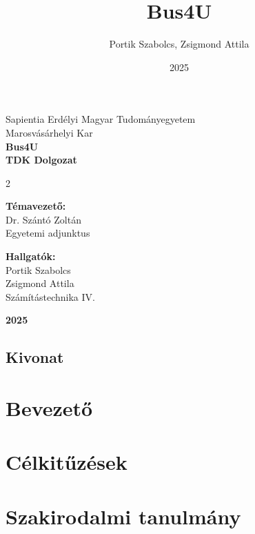 \documentclass[12pt, twoside]{report}
\title{Bus4U}
\author{Portik Szabolcs, Zsigmond Attila}
\date{2025}
\begin{document}
\begin{titlepage}
  \center
  \Large
  Sapientia Erdélyi Magyar Tudományegyetem \\
  Marosvásárhelyi Kar \\
  \vspace{2in}
  \Huge
  \textbf{Bus4U} \\
  \vspace{0.5in}
  \textbf{TDK Dolgozat} \\
  \vspace{1.5in}
  \Large
  \begin{multicols}{2}
    \begin{flushleft}
      \textbf{Témavezető:} \\
      Dr. Szántó Zoltán \\
      Egyetemi adjunktus
    \end{flushleft}
    \columnbreak
    \begin{flushright}
      \textbf{Hallgatók:} \\
      Portik Szabolcs \\
      Zsigmond Attila \\
      Számítástechnika IV.
    \end{flushright}
  \end{multicols}
  \Huge
  \textbf{2025}
\end{titlepage}


\tableofcontents

\newpage
\section*{Kivonat}



\chapter{Bevezető}


\chapter{Célkitűzések}


\chapter{Szakirodalmi tanulmány}

\end{document}
